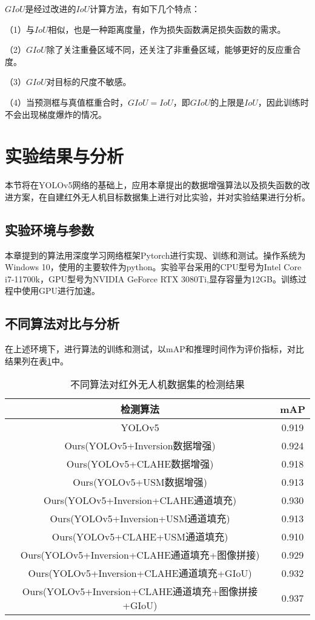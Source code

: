 $GIoU$是经过改进的$IoU$计算方法，有如下几个特点：

（1）与$IoU$相似，也是一种距离度量，作为损失函数满足损失函数的需求。

（2）$GIoU$除了关注重叠区域不同，还关注了非重叠区域，能够更好的反应重合度。

（3）$GIoU$对目标的尺度不敏感。

（4）当预测框与真值框重合时，$GIoU=IoU$，即$GIoU$的上限是$IoU$，因此训练时不会出现梯度爆炸的情况。

\section{实验结果与分析}
本节将在YOLOv5网络的基础上，应用本章提出的数据增强算法以及损失函数的改进方案，在自建红外无人机目标数据集上进行对比实验，并对实验结果进行分析。


\subsection{实验环境与参数}
本章提到的算法用深度学习网络框架Pytorch进行实现、训练和测试。操作系统为Windows 10，使用的主要软件为python。实验平台采用的CPU型号为Intel Core i7-11700k，GPU型号为NVIDIA GeForce RTX 3080Ti,显存容量为12GB。训练过程中使用GPU进行加速。

\subsection{不同算法对比与分析}
在上述环境下，进行算法的训练和测试，以mAP和推理时间作为评价指标，对比结果列在表\ref{m1}中。

\begin{table}[htbp]
  \caption{不同算法对红外无人机数据集的检测结果}
  \vspace{0.5em}\centering\wuhao
  \begin{tabular}{cc}
  \toprule
  检测算法 & mAP\\
  \midrule
  YOLOv5 & 0.919\\
  Ours(YOLOv5+Inversion数据增强) & 0.924\\
  Ours(YOLOv5+CLAHE数据增强) & 0.918\\
  Ours(YOLOv5+USM数据增强) & 0.913\\
  Ours(YOLOv5+Inversion+CLAHE通道填充) & 0.930\\
  Ours(YOLOv5+Inversion+USM通道填充) & 0.913\\
  Ours(YOLOv5+CLAHE+USM通道填充) & 0.910\\
  Ours(YOLOv5+Inversion+CLAHE通道填充+图像拼接) & 0.929\\
  Ours(YOLOv5+Inversion+CLAHE通道填充+GIoU) & 0.932\\
  Ours(YOLOv5+Inversion+CLAHE通道填充+图像拼接+GIoU) & 0.937\\
  \bottomrule
  \end{tabular}
  \label{m1}
\end{table}

